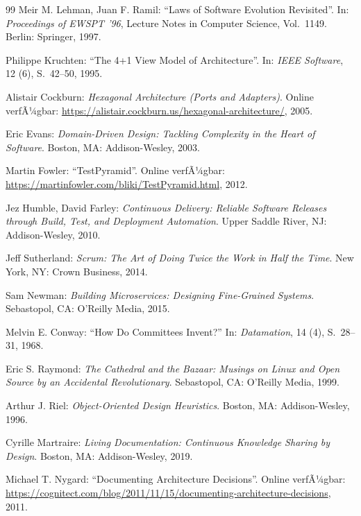 ﻿\documentclass[a4paper,12pt]{article}
\begin{document}
\begin{thebibliography}{99}
	Meir M. Lehman, Juan F. Ramil:
	\enquote{Laws of Software Evolution Revisited}.
	In: \textit{Proceedings of EWSPT '96}, Lecture Notes in Computer Science,
	Vol.~1149. Berlin: Springer, 1997.
	
	Philippe Kruchten:
	\enquote{The 4+1 View Model of Architecture}.
	In: \textit{IEEE Software}, 12 (6), S.~42--50, 1995.
	
	Alistair Cockburn:
	\textit{Hexagonal Architecture (Ports and Adapters)}.
	Online verfÃ¼gbar: \url{https://alistair.cockburn.us/hexagonal-architecture/}, 2005.
	
	Eric Evans:
	\textit{Domain-Driven Design: Tackling Complexity in the Heart of Software}.
	Boston, MA: Addison-Wesley, 2003.
	
	Martin Fowler:
	\enquote{TestPyramid}.
	Online verfÃ¼gbar: \url{https://martinfowler.com/bliki/TestPyramid.html}, 2012.
	
	Jez Humble, David Farley:
	\textit{Continuous Delivery: Reliable Software Releases through Build, Test,
		and Deployment Automation}.
	Upper Saddle River, NJ: Addison-Wesley, 2010.
	
	Jeff Sutherland:
	\textit{Scrum: The Art of Doing Twice the Work in Half the Time}.
	New York, NY: Crown Business, 2014.
	
	Sam Newman:
	\textit{Building Microservices: Designing Fine-Grained Systems}.
	Sebastopol, CA: O'Reilly Media, 2015.
	
	Melvin E. Conway:
	\enquote{How Do Committees Invent?}
	In: \textit{Datamation}, 14 (4), S.~28--31, 1968.
	
	Eric S. Raymond:
	\textit{The Cathedral and the Bazaar: Musings on Linux and Open Source by an
		Accidental Revolutionary}.
	Sebastopol, CA: O'Reilly Media, 1999.
	
	Arthur J. Riel:
	\textit{Object-Oriented Design Heuristics}.
	Boston, MA: Addison-Wesley, 1996.
	
	Cyrille Martraire:
	\textit{Living Documentation: Continuous Knowledge Sharing by Design}.
	Boston, MA: Addison-Wesley, 2019.
	
	Michael T. Nygard:
	\enquote{Documenting Architecture Decisions}.
	Online verfÃ¼gbar: \url{https://cognitect.com/blog/2011/11/15/documenting-architecture-decisions},
	2011.
	

\end{thebibliography}
\end{document}
